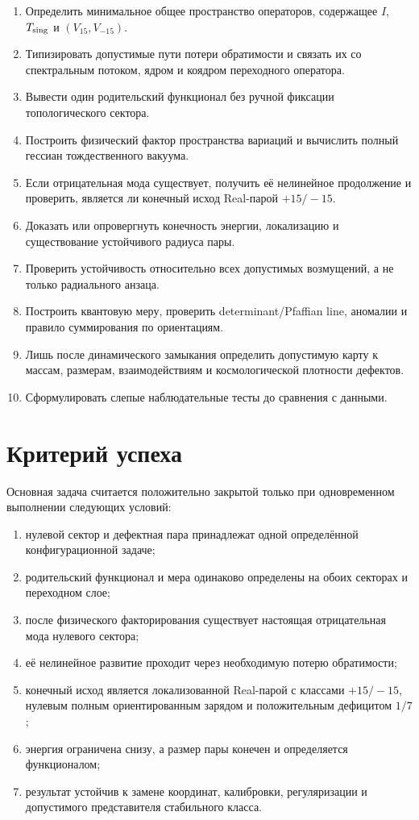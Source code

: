 \begin{enumerate}
 \item Определить минимальное общее пространство операторов, содержащее
 $I$, $T_{\rm sing}$ и $(V_{15},V_{-15})$.
 \item Типизировать допустимые пути потери обратимости и связать их со
 спектральным потоком, ядром и коядром переходного оператора.
 \item Вывести один родительский функционал без ручной фиксации
 топологического сектора.
 \item Построить физический фактор пространства вариаций и вычислить
 полный гессиан тождественного вакуума.
 \item Если отрицательная мода существует, получить её нелинейное
 продолжение и проверить, является ли конечный исход Real-парой
 $+15/-15$.
 \item Доказать или опровергнуть конечность энергии, локализацию и
 существование устойчивого радиуса пары.
 \item Проверить устойчивость относительно всех допустимых возмущений,
 а не только радиального анзаца.
 \item Построить квантовую меру, проверить determinant/Pfaffian line,
 аномалии и правило суммирования по ориентациям.
 \item Лишь после динамического замыкания определить допустимую карту к
 массам, размерам, взаимодействиям и космологической плотности дефектов.
 \item Сформулировать слепые наблюдательные тесты до сравнения с данными.
\end{enumerate}

\section{Критерий успеха}

Основная задача считается положительно закрытой только при одновременном
выполнении следующих условий:
\begin{enumerate}
 \item нулевой сектор и дефектная пара принадлежат одной определённой
 конфигурационной задаче;
 \item родительский функционал и мера одинаково определены на обоих
 секторах и переходном слое;
 \item после физического факторирования существует настоящая отрицательная
 мода нулевого сектора;
 \item её нелинейное развитие проходит через необходимую потерю
 обратимости;
 \item конечный исход является локализованной Real-парой с классами
 $+15/-15$, нулевым полным ориентированным зарядом и положительным
 дефицитом $1/7$;
 \item энергия ограничена снизу, а размер пары конечен и определяется
 функционалом;
 \item результат устойчив к замене координат, калибровки, регуляризации
 и допустимого представителя стабильного класса.
\end{enumerate}

